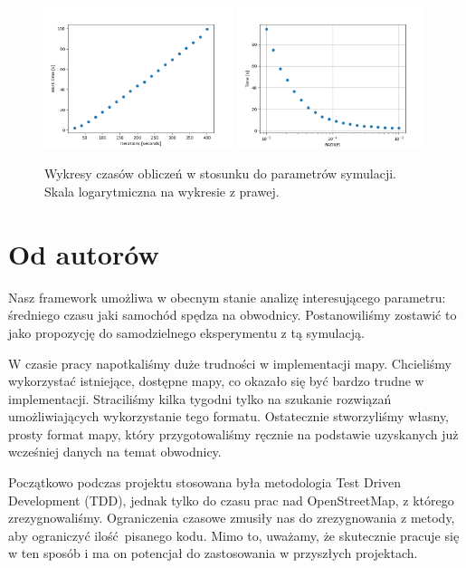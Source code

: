 \documentclass[a4paper,12pt]{article}
\begin{document}
    \begin{figure}[H]
    	\centering
    	\includegraphics[width=0.49\textwidth]{img/perf.png}
    	\includegraphics[width=0.49\textwidth]{img/perf-vs-radius.png}
    	\caption{Wykresy czasów obliczeń w stosunku do parametrów symulacji. Skala logarytmiczna na wykresie z prawej.}
    \end{figure}
		
    \section{Od autorów}
    Nasz framework umożliwa w obecnym stanie analizę interesującego parametru: średniego czasu jaki samochód spędza na obwodnicy. Postanowiliśmy zostawić to jako propozycję do samodzielnego eksperymentu z tą symulacją.
    
    W czasie pracy napotkaliśmy duże trudności w implementacji mapy. Chcieliśmy wykorzystać istniejące, dostępne mapy, co okazało się być bardzo trudne w implementacji. Straciliśmy kilka tygodni tylko na szukanie rozwiązań umożliwiających wykorzystanie tego formatu. Ostatecznie stworzyliśmy własny, prosty format mapy, który przygotowaliśmy ręcznie na podstawie uzyskanych już wcześniej danych na temat obwodnicy.
    
    Początkowo podczas projektu stosowana była metodologia Test Driven Development (TDD), jednak tylko do czasu prac nad OpenStreetMap, z którego zrezygnowaliśmy. Ograniczenia czasowe zmusiły nas do zrezygnowania z metody, aby ograniczyć ilość pisanego kodu. Mimo to, uważamy, że skutecznie pracuje się w ten sposób i ma on potencjał do zastosowania w przyszłych projektach.
\end{document}
